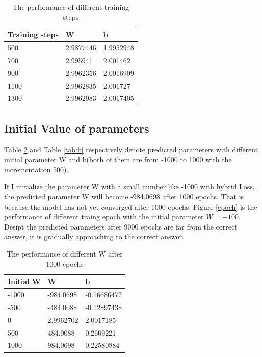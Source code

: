\documentclass{article}
\begin{document}
\begin{table}[!h]
  \caption{The performance of different training steps}
  \label{tab:ts}
  \centering
  \begin{tabular}{lll}
    \toprule
    Training steps     & W     & b \\
    \midrule
    500 & 2.9877446  & 1.9952948     \\
    700     & 2.995941 & 2.001462     \\
    900     & 2.9962356       & 2.0016909  \\
    1100     & 2.9962835 & 2.001727      \\
    1300    & 2.9962983      & 2.0017405  \\
    \bottomrule
  \end{tabular}
\end{table}

\subsection{Initial Value of parameters}
Table \ref{tab:w} and Table \ref{tab:b} respectively denote predicted parameters with different initial parameter W and b(both of them are from -1000 to 1000 with the incrementation 500).

If I initialize the parameter W with a small number like -1000 with hybrid Loss, the predicted parameter W will become -984.0698 after 1000 epochs. That is because the model has not yet converged after 1000 epochs. Figure \ref{epoch} is the performance of different traing epoch with the initial parameter $W=-100$. Desipt the predicted parameters after 9000 epochs are far from the correct answer, it is gradually approaching to the correct answer.

\begin{table}[!h]
  \caption{The performance of different W after 1000 epochs}
  \label{tab:w}
  \centering
  \begin{tabular}{lll}
    \toprule
    Initial W     & W     & b  \\
    \midrule
    -1000 & -984.0698 & -0.16686472    \\
    -500     & -484.0088 & -0.12897438     \\
    0     & 2.9962702      & 2.0017185  \\
    500     & 484.0088 & 0.2609221     \\
    1000    & 984.0698     & 0.22580884  \\
    \bottomrule
  \end{tabular}
\end{table}
\end{document}
